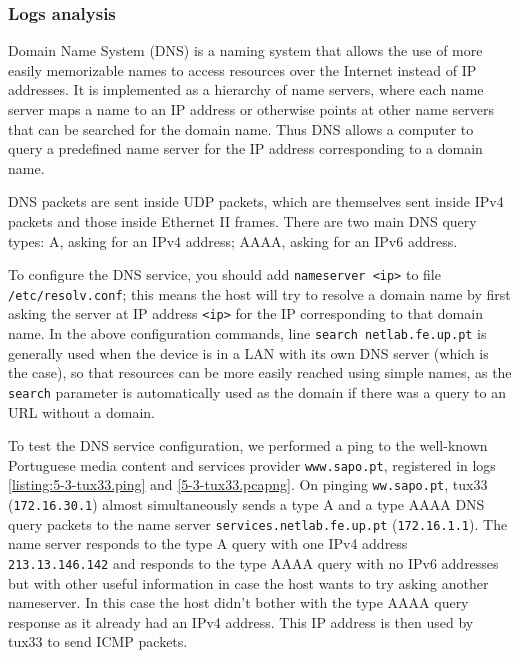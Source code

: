 \documentclass[a4paper, 11pt]{report}
\begin{document}
\subsubsection{Logs analysis} \label{sec:Log5}

Domain Name System (DNS) is a naming system that allows the use of more easily memorizable names to access resources over the Internet instead of IP addresses.
It is implemented as a hierarchy of name servers, where each name server maps a name to an IP address or otherwise points at other name servers that can be searched for the domain name.
Thus DNS allows a computer to query a predefined name server for the IP address corresponding to a domain name.

DNS packets are sent inside UDP packets, which are themselves sent inside IPv4 packets and those inside Ethernet II frames.
There are two main DNS query types: A, asking for an IPv4 address; AAAA, asking for an IPv6 address.

To configure the DNS service, you should add \texttt{nameserver <ip>} to file \texttt{/etc/resolv.conf}; this means the host will try to resolve a domain name by first asking the server at IP address \texttt{<ip>} for the IP corresponding to that domain name.
In the above configuration commands, line \texttt{search netlab.fe.up.pt} is generally used when the device is in a LAN with its own DNS server (which is the case), so that resources can be more easily reached using simple names, as the \texttt{search} parameter is automatically used as the domain if there was a query to an URL without a domain.

To test the DNS service configuration, we performed a ping to the well-known Portuguese media content and services provider \texttt{www.sapo.pt}, registered in logs \ref{listing:5-3-tux33.ping} and \ref{5-3-tux33.pcapng}.
On pinging \texttt{ww.sapo.pt}, tux33 (\texttt{172.16.30.1}) almost simultaneously sends a type A and a type AAAA DNS query packets to the name server \texttt{services.netlab.fe.up.pt} (\texttt{172.16.1.1}).
The name server responds to the type A query with one IPv4 address \texttt{213.13.146.142} and responds to the type AAAA query with no IPv6 addresses but with other useful information in case the host wants to try asking another nameserver.
In this case the host didn't bother with the type AAAA query response as it already had an IPv4 address.
This IP address is then used by tux33 to send ICMP packets.
\end{document}
